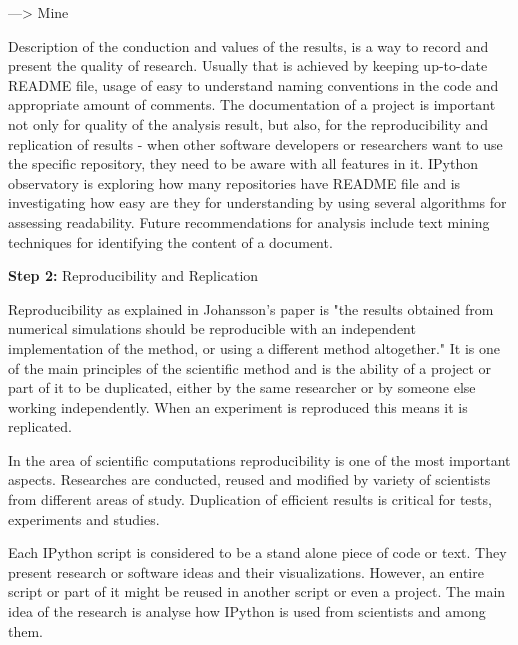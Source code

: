 ---> Mine

Description of the conduction and values of the results, is a way to record and present the quality of research. Usually that is achieved by keeping up-to-date README file, usage of easy to understand naming conventions in the code and appropriate amount of comments. The documentation of a project is important not only for quality of the analysis result, but also, for the reproducibility and replication of results - when other software developers or researchers want to use the specific repository, they need to be aware with all features in it. IPython observatory is exploring how many repositories have README file and is investigating how easy are they for understanding by using several algorithms for assessing readability. Future recommendations for analysis include text mining techniques for identifying the content of a document. 


\vspace{5mm}
\begin{mdframed}
\vspace{1px}
\textbf{Step 2:} Reproducibility and Replication
\vspace{1px}
\end{mdframed}
\vspace{2mm}

Reproducibility as explained in Johansson's paper \cite{johansson2014introduction} is "the results obtained from numerical simulations should be reproducible with an independent implementation of the method, or using a different method altogether." It is one of the main principles of the scientific method\cite{cohen2013introduction} and is the ability of a project or part of it to be duplicated, either by the same researcher or by someone else working independently\cite{reproducibilityWiki}. When an experiment is reproduced this means it is replicated.

In the area of scientific computations reproducibility is one of the most important aspects. Researches are conducted, reused and modified by variety of scientists from different areas of study. Duplication of efficient results is critical for tests, experiments and studies.

Each IPython script is considered to be a stand alone piece of code or text. They present research or software ideas and their visualizations. However, an entire script or part of it might be reused in another script or even a project. The main idea of the research is analyse how IPython is used from scientists and among them.

